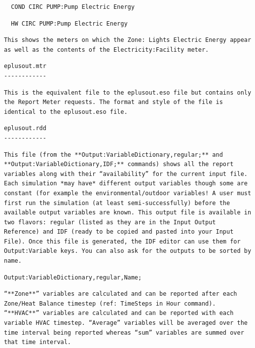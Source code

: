 \begin{lstlisting}
  COND CIRC PUMP:Pump Electric Energy
\end{lstlisting}

\begin{lstlisting}
  HW CIRC PUMP:Pump Electric Energy
\end{lstlisting}

\begin{lstlisting}
This shows the meters on which the Zone: Lights Electric Energy appear as well as the contents of the Electricity:Facility meter.
\end{lstlisting}

\begin{lstlisting}
eplusout.mtr
------------
\end{lstlisting}

\begin{lstlisting}
This is the equivalent file to the eplusout.eso file but contains only the Report Meter requests. The format and style of the file is identical to the eplusout.eso file.
\end{lstlisting}

\begin{lstlisting}
eplusout.rdd
------------
\end{lstlisting}

\begin{lstlisting}
This file (from the **Output:VariableDictionary,regular;** and **Output:VariableDictionary,IDF;** commands) shows all the report variables along with their “availability” for the current input file. Each simulation *may have* different output variables though some are constant (for example the environmental/outdoor variables! A user must first run the simulation (at least semi-successfully) before the available output variables are known. This output file is available in two flavors: regular (listed as they are in the Input Output Reference) and IDF (ready to be copied and pasted into your Input File). Once this file is generated, the IDF editor can use them for Output:Variable keys. You can also ask for the outputs to be sorted by name.
\end{lstlisting}

\begin{lstlisting}
Output:VariableDictionary,regular,Name;
\end{lstlisting}

\begin{lstlisting}
“**Zone**” variables are calculated and can be reported after each Zone/Heat Balance timestep (ref: TimeSteps in Hour command). “**HVAC**” variables are calculated and can be reported with each variable HVAC timestep. “Average” variables will be averaged over the time interval being reported whereas “sum” variables are summed over that time interval.
\end{lstlisting}

